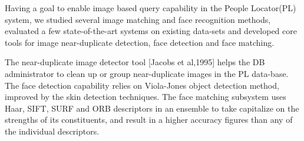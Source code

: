 
\begin{xpsectionbox}{}{}
Having a goal to enable image based query capability in the People Locator\texttrademark (PL) system, we studied several image matching and face recognition methods, evaluated a few state-of-the-art systems on existing data-sets and developed core tools for image near-duplicate detection, face detection and face matching.

The near-duplicate image detector tool [Jacobs et al,1995] helps the DB administrator to clean up or group near-duplicate images in the PL data-base. The face detection capability relies on Viola-Jones object detection method, improved by the skin detection techniques. The face matching subsystem uses Haar, SIFT, SURF and ORB descriptors in an ensemble to take capitalize on the strengths of its constituents, and result in a higher accuracy figures than any of the individual descriptors.

\end{xpsectionbox}



